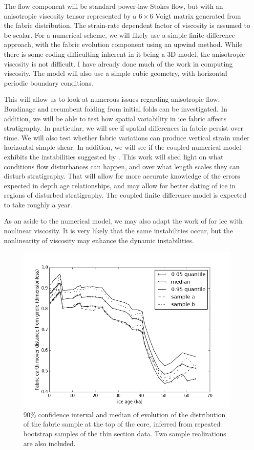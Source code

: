 \documentclass{article}
\begin{document}
The flow component will be standard power-law Stokes flow, but with an anisotropic viscosity tensor represented by a $6 \times 6$ Voigt matrix generated from the fabric distribution. The strain-rate dependent factor of viscosity is assumed to be scalar. For a numerical scheme, we will likely use a simple finite-difference approach, with the fabric evolution component using an upwind method. While there is some coding difficulting inherent in it being a 3D model, the anisotropic viscosity is not difficult. I have already done much of the work in computing viscosity. The model will also use a simple cubic geometry, with horizontal periodic boundary conditions.

This will allow us to look at numerous issues regarding anisotropic flow. Boudinage and recumbent folding from initial folds can be investigated. In addition, we will be able to test how spatial variability in ice fabric affects stratigraphy. In particular, we will see if spatial differences in fabric persist over time. We will also test whether fabric variations can produce vertical strain under horizontal simple shear. In addition, we will see if the coupled numerical model exhibits the instabilities suggested by \citet{montgomery-smith2011}. This work will shed light on what conditions flow disturbances can happen, and over what length scales they can disturb stratigraphy. That will allow for more accurate knowledge of the errors expected in depth age relationships, and may allow for better dating of ice in regions of disturbed stratigraphy. The coupled finite difference model is expected to take roughly a year.

As an aside to the numerical model, we may also adapt the work of \citet{montgomery-smith2011} for ice with nonlinear viscosity. It is very likely that the same instabilities occur, but the nonlinearity of viscosity may enhance the dynamic instabilities.

\begin{figure}
\caption{90\% confidence interval and median of evolution of the distribution of the fabric sample at the top of the core, inferred from repeated bootstrap samples of the thin section data. Two sample realizations are also included.}
\includegraphics[width=12cm]{ci}
\end{figure}
\end{document}
